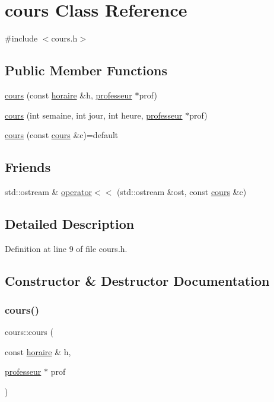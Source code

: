 \hypertarget{classcours}{}\section{cours Class Reference}
\label{classcours}


{\ttfamily \#include $<$cours.\+h$>$}

\subsection*{Public Member Functions}
\begin{DoxyCompactItemize}
\item 
\hyperlink{classcours_a64d575197dcd1276d2f460a159b0aa67}{cours} (const \hyperlink{classhoraire}{horaire} \&h, \hyperlink{classprofesseur}{professeur} $\ast$prof)
\item 
\hyperlink{classcours_a76210058976f92c2f09b047f68fa2e82}{cours} (int semaine, int jour, int heure, \hyperlink{classprofesseur}{professeur} $\ast$prof)
\item 
\hyperlink{classcours_a95b69b7789c5dab7116c0b89d78197ec}{cours} (const \hyperlink{classcours}{cours} \&c)=default
\end{DoxyCompactItemize}
\subsection*{Friends}
\begin{DoxyCompactItemize}
\item 
std\+::ostream \& \hyperlink{classcours_aecc19592d3206061c4aefd63e2cf7473}{operator$<$$<$} (std\+::ostream \&ost, const \hyperlink{classcours}{cours} \&c)
\end{DoxyCompactItemize}


\subsection{Detailed Description}


Definition at line 9 of file cours.\+h.



\subsection{Constructor \& Destructor Documentation}
\hypertarget{classcours_a64d575197dcd1276d2f460a159b0aa67}{}\label{classcours_a64d575197dcd1276d2f460a159b0aa67} 
\subsubsection{\texorpdfstring{cours()}{cours()}\hspace{0.1cm}{\footnotesize\ttfamily [1/3]}}
{\footnotesize\ttfamily cours\+::cours (\begin{DoxyParamCaption}\item[{const \hyperlink{classhoraire}{horaire} \&}]{h,  }\item[{\hyperlink{classprofesseur}{professeur} $\ast$}]{prof }\end{DoxyParamCaption})}



